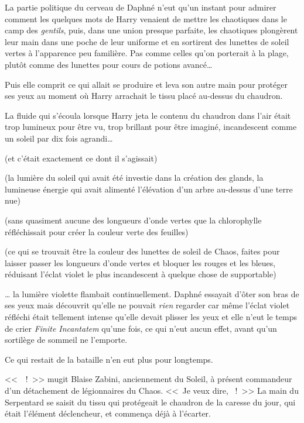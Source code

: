 La partie politique du cerveau de Daphné n'eut qu'un instant pour admirer comment les quelques mots de Harry venaient de mettre les chaotiques dans le camp des \emph{gentils}, puis, dans une union presque parfaite, les chaotiques plongèrent leur main dans une poche de leur uniforme et en sortirent des lunettes de soleil vertes à l'apparence peu familière. Pas comme celles qu'on porterait à la plage, plutôt comme des lunettes pour cours de potions avancé…

Puis elle comprit ce qui allait se produire et leva son autre main pour protéger ses yeux au moment où Harry arrachait le tissu placé au-dessus du chaudron.

La fluide qui s'écoula lorsque Harry jeta le contenu du chaudron dans l'air était trop lumineux pour être vu, trop brillant pour être imaginé, incandescent comme un soleil par dix fois agrandi…

(et c'était exactement ce dont il s'agissait)

(la lumière du soleil qui avait été investie dans la création des glands, la lumineuse énergie qui avait alimenté l'élévation d'un arbre au-dessus d'une terre nue)

(sans quasiment aucune des longueurs d'onde vertes que la chlorophylle réfléchissait pour créer la couleur verte des feuilles)

(ce qui se trouvait être la couleur des lunettes de soleil de Chaos, faites pour laisser passer les longueurs d'onde vertes et bloquer les rouges et les bleues, réduisant l'éclat violet le plus incandescent à quelque chose de supportable)

… la lumière violette flambait continuellement. Daphné essayait d'ôter son bras de ses yeux mais découvrit qu'elle ne pouvait \emph{rien} regarder car même l'éclat violet réfléchi était tellement intense qu'elle devait plisser les yeux et elle n'eut le temps de crier \emph{Finite Incantatem} qu'une fois, ce qui n'eut aucun effet, avant qu'un sortilège de sommeil ne l'emporte.

Ce qui restait de la bataille n'en eut plus pour longtemps.

\later

<<~~!~>> mugit Blaise Zabini, anciennement du Soleil, à présent commandeur d'un détachement de légionnaires du Chaos. <<~Je veux dire, ~!~>> La main du Serpentard se saisit du tissu qui protégeait le chaudron de la caresse du jour, qui était l'élément déclencheur, et commença déjà à l'écarter.

